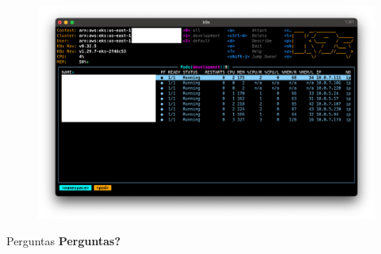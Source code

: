 \documentclass[aspectratio=169]{beamer}
\begin{document}
\begin{frame}
	
	\begin{figure}
		\centering
		\includegraphics[width=0.9\linewidth]{Images/east}
		
	\end{figure}
	
\end{frame}

\begin{frame}{Perguntas}
	\centering
	\textbf{\Large Perguntas?}
\end{frame}
\end{document}
